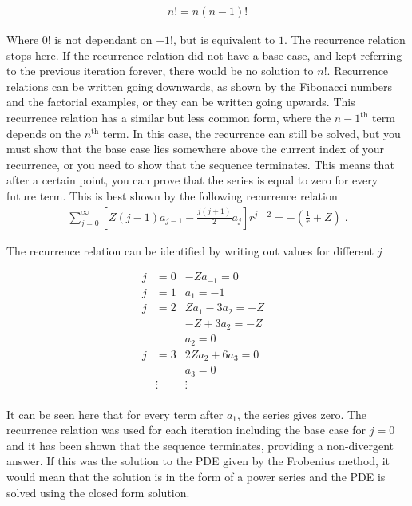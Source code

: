         \begin{align}
            n! = n(n-1)!
        \end{align}

        Where $0!$ is not dependant on $-1!$, but is equivalent to $1$. The recurrence relation stops here. If the recurrence relation did not have a base case, and kept referring to the previous iteration forever, there would be no solution to $n!$. Recurrence relations can be written going downwards, as shown by the Fibonacci numbers and the factorial examples, or they can be written going upwards. This recurrence relation has a similar but less common form, where the $n-1^{\text{th}}$ term depends on the $n^{\text{th}}$ term. In this case, the recurrence can still be solved, but you must show that the base case lies somewhere above the current index of your recurrence, or you need to show that the sequence terminates. This means that after a certain point, you can prove that the series is equal to zero for every future term. This is best shown by the following recurrence relation 
        \begin{align}
            \sum_{j = 0}^\infty \left[ Z(j - 1) a_{j - 1} - \frac{j(j+1)}{2} a_j \right] r^{j - 2} = -\left(\frac{1}{r} + Z\right)\;.
        \end{align}

        \noindent The recurrence relation can be identified by writing out values for different $j$ 

        \begin{align}
            j &= 0 & -Za_{-1} = 0&\\ \nonumber
            j &= 1 & a_1 = -1&\\ \nonumber
            j &= 2 & Za_1 - 3a_2 = -Z&\\ \nonumber
            & & -Z + 3a_2 = -Z&\\ \nonumber
            & & a_2 = 0&\\ \nonumber
            j &= 3 & 2Za_2 + 6a_3 = 0&\\ \nonumber
            & & a_3 = 0&\\ \nonumber
            & \vdots & \vdots & \\
        \end{align}

        \noindent It can be seen here that for every term after $a_1$, the series gives zero. The recurrence relation was used for each iteration including the base case for $j = 0$ and it has been shown that the sequence terminates, providing a non-divergent answer. If this was the solution to the PDE given by the Frobenius method, it would mean that the solution is in the form of a power series and the PDE is solved using the closed form solution.

